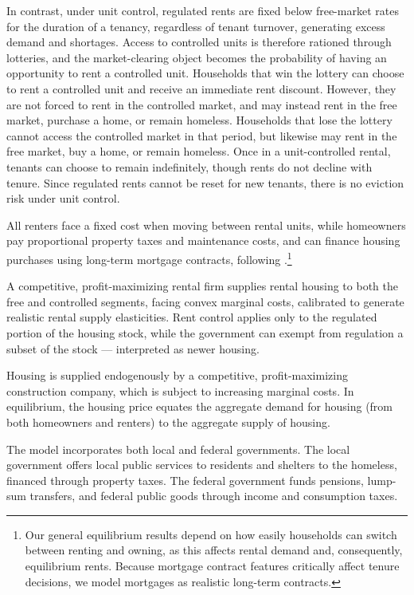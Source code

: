 \documentclass[parskip=full]{article}
\begin{document}
In contrast, under unit control, regulated rents are fixed below free-market rates for the duration of a tenancy, regardless of tenant turnover, generating excess demand and shortages. Access to controlled units is therefore rationed through lotteries, and the market-clearing object becomes the probability of having an opportunity to rent a controlled unit. Households that win the lottery can choose to rent a controlled unit and receive an immediate rent discount. However, they are not forced to rent in the controlled market, and may instead rent in the free market, purchase a home, or remain homeless. Households that lose the lottery cannot access the controlled market in that period, but likewise may rent in the free market, buy a home, or remain homeless. Once in a unit-controlled rental, tenants can choose to remain indefinitely, though rents do not decline with tenure. Since regulated rents cannot be reset for new tenants, there is no eviction risk under unit control.

All renters face a fixed cost when moving between rental units, while homeowners pay proportional property taxes and maintenance costs, and can finance housing purchases using long-term mortgage contracts, following \citet{kkk-2021}.\footnote{Our general equilibrium results depend on how easily households can switch between renting and owning, as this affects rental demand and, consequently, equilibrium rents. Because mortgage contract features critically affect tenure decisions, we model mortgages as realistic long-term contracts.} 

A competitive, profit-maximizing rental firm supplies rental housing to both the free and controlled segments, facing convex marginal costs, calibrated to generate realistic rental supply elasticities. Rent control applies only to the regulated portion of the housing stock, while the government can exempt from regulation a subset of the stock — interpreted as newer housing.

Housing is supplied endogenously by a competitive, profit-maximizing construction company, which is subject to increasing marginal costs. In equilibrium, the housing price equates the aggregate demand for housing (from both homeowners and renters) to the aggregate supply of housing.

The model incorporates both local and federal governments. The local government offers local public services to residents and shelters to the homeless, financed through property taxes. The federal government funds pensions, lump-sum transfers, and federal public goods through income and consumption taxes.
\end{document}
